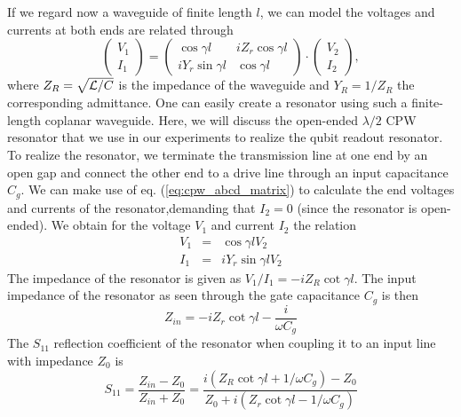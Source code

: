 \smallskip

If we regard now a waveguide of finite length $l$, we can model the voltages and currents at both ends are related through \citep{pozar_microwave_2011}
%
\begin{equation}
\left( \begin{array}{c} V_1 \\ I_1 \end{array}\right) = \left( 
		\begin{array}{cc}
			\cos{\gamma l} & iZ_r \cos{\gamma l} \\
			i Y_r \sin{\gamma l} & \cos{\gamma l}
		\end{array}
		\right) \cdot \left(
		\begin{array}{c}
			V_2 \\ I_2
		\end{array}
		\right), \label{eq:cpw_abcd_matrix}
\end{equation}
%
where $Z_R=\sqrt{\begin{mathcal}L/C\end{mathcal}}$ is the impedance of the waveguide and $Y_R=1/Z_R$ the corresponding admittance. One can easily create a resonator using such a finite-length coplanar waveguide. Here, we will discuss the open-ended $\lambda / 2$ CPW resonator that we use in our experiments to realize the qubit readout resonator. To realize the resonator, we terminate the transmission line at one end by an open gap and connect the other end to a drive line through an input capacitance $C_g$. We can make use of eq. (\ref{eq:cpw_abcd_matrix}) to calculate the end voltages and currents of the resonator,demanding that $I_2=0$ (since the resonator is open-ended). We obtain for the voltage $V_1$ and current $I_2$ the relation
%
\begin{eqnarray}
V_1 & = & \cos{\gamma l} V_2 \\
I_1 & = & i Y_r \sin{\gamma l} V_2
\end{eqnarray}
%
The impedance of the resonator is given as $V_1/I_1 = -i Z_R \cot{\gamma l}$. The input impedance of the resonator as seen through the gate capacitance $C_g$ is then
%
\begin{equation}
Z_{in} = -i Z_r \cot{\gamma l}-\frac{i}{\omega C_g} \label{eq:cpw_impedance}
\end{equation}
%
The $S_{11}$ reflection coefficient of the resonator when coupling it to an input line with impedance $Z_0$ is
%
\begin{equation}
S_{11} = \frac{Z_{in}-Z_0}{Z_{in}+Z_0} = \frac{i(Z_R\cot{\gamma l}+1/\omega C_g)-Z_0}{Z_0+i(Z_r\cot{\gamma l}-1/\omega C_g)}
\end{equation}

